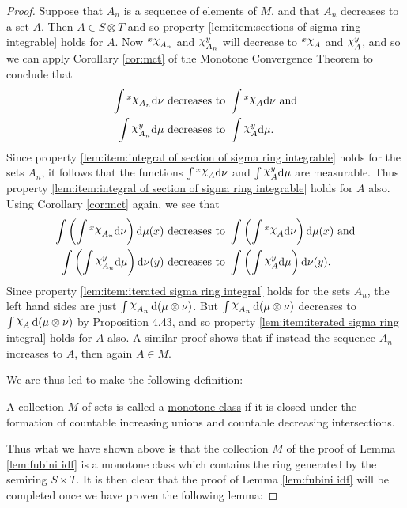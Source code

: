 \begin{proof}
Suppose that $A_n$ is a sequence of elements of $M$, and that $A_n$ decreases to a set $A$. Then $A\in S\otimes T$ and so property \ref{lem:item:sections of sigma ring integrable} holds for $A$. Now $\xsec{\idf{A_n}}{x}$ and $\ysec{\idf{A_n}}{y}$ will decrease to $\xsec{\idf{A}}{x}$ and $\ysec{\idf{A}}{y}$, and so we can apply Corollary \ref{cor:mct} of the Monotone Convergence Theorem to conclude that
\begin{align*}
\int\xsec{\idf{A_n}}{x}\dd\nu&\text { decreases to }\int\xsec{\idf{A}}{x}\dd\nu\text{ and}\\
\int\ysec{\idf{A_n}}{y}\dd\mu&\text { decreases to }\int\ysec{\idf{A}}{y}\dd\mu.
\end{align*}
Since property \ref{lem:item:integral of section of sigma ring integrable} holds for the sets $A_n$, it follows that the functions $\int\xsec{\idf{A}}{x}\dd\nu$ and $\int\ysec{\idf{A}}{y}\dd\mu$ are measurable. Thus property \ref{lem:item:integral of section of sigma ring integrable} holds for $A$ also. Using Corollary \ref{cor:mct} again, we see that
\begin{align*}
\int\br{\int\xsec{\idf{A_n}}{x}\dd\nu}\dd\mu(x)&\text { decreases to }\int\br{\int\xsec{\idf{A}}{x}\dd\nu}\dd\mu(x)\text{ and}\\
\int\br{\int\ysec{\idf{A_n}}{y}\dd\mu}\dd\nu(y)&\text { decreases to }\int\br{\int\ysec{\idf{A}}{y}\dd\mu}\dd\nu(y).
\end{align*}
Since property \ref{lem:item:iterated sigma ring integral} holds for the sets $A_n$, the left hand sides are just $\int\idf{A_n}\dd(\mu\otimes\nu)$. But $\int\idf{A_n}\dd(\mu\otimes\nu)$ decreases to $\int\idf{A}\dd(\mu\otimes\nu)$ by Proposition 4.43, and so property \ref{lem:item:iterated sigma ring integral} holds for $A$ also. A similar proof shows that if instead the sequence $A_n$ increases to $A$, then again $A\in M$.

We are thus led to make the following definition:

\begin{definition}
A collection $M$ of sets is called a \underline{monotone class} if it is closed under the formation of countable increasing unions and countable decreasing intersections.
\end{definition}

Thus what we have shown above is that the collection $M$ of the proof of Lemma \ref{lem:fubini idf} is a monotone class which contains the ring generated by the semiring $S\times T$. It is then clear that the proof of Lemma \ref{lem:fubini idf} will be completed once we have proven the following lemma:


\end{proof}
